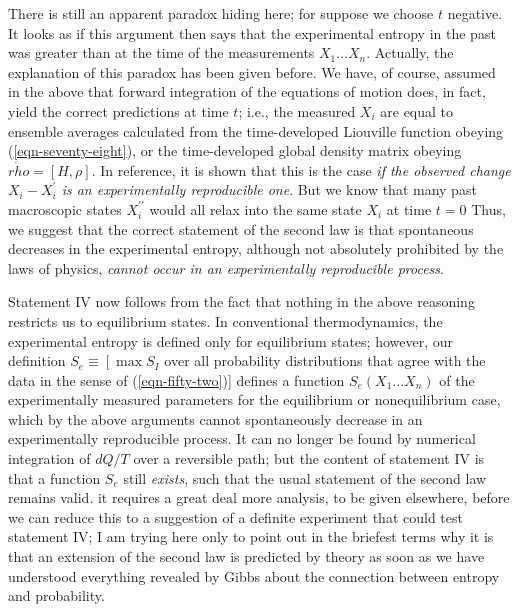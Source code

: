 \documentclass[]{article}
\begin{document}
There is still an apparent paradox hiding here; for suppose we choose $t$ negative. It looks as if this argument then says that the experimental entropy in the past was greater than at the time of the measurements $X_{1} \ldots X_{n}$. Actually, the explanation of this paradox has been given before.\citep{Jaynes-information-II-57} We have, of course, assumed in the above that forward integration of the equations of motion does, in fact, yield the correct predictions at time $t$; i.e., the measured $X _{ i }$ are equal to ensemble averages calculated from the time-developed Liouville function obeying (\ref{eqn-seventy-eight}), or the time-developed global density matrix obeying  $\dot{rho}=[ H , \rho]$. In reference,\citep{Jaynes-information-II-57} it is shown that this is the case \emph{if the observed change $X_{i}-X_{i}^\prime$ is an experimentally reproducible one}. But we know that many past macroscopic states $X _{ i }^{\prime\prime}$ would all relax into the same state $X _{ i }$ at time $t=0$ Thus, we suggest that the correct statement of the second law is that spontaneous decreases in the experimental entropy, although not absolutely prohibited by the laws of physics, \emph{cannot occur in an experimentally reproducible process}. 

Statement IV now follows from the fact that nothing in the above reasoning restricts us to equilibrium states. In conventional thermodynamics, the experimental entropy is defined only for equilibrium states; however, our definition $S _{ e } \equiv\left[\max S _{ I }\right.$ over all probability distributions that agree with the data in the sense of
(\ref{eqn-fifty-two})] defines a function $S_{e}\left(X_{1} \ldots X_{n}\right)$ of the experimentally measured parameters for the equilibrium or nonequilibrium case, which by the above arguments cannot spontaneously decrease in an experimentally reproducible process. It can no longer be found by numerical integration of $dQ/T$ over a reversible path; but the content of statement IV is that a function $S _{ e }$ still \emph{exists}, such that the usual statement of the second law remains valid. it requires a great deal more analysis, to be given elsewhere, before we can reduce this to a suggestion of a definite experiment that could test statement IV; I am trying here only to point out in the briefest terms why it is that an extension of the second law is predicted by theory as soon as we have understood everything revealed by Gibbs about the connection between entropy and probability.
\end{document}
